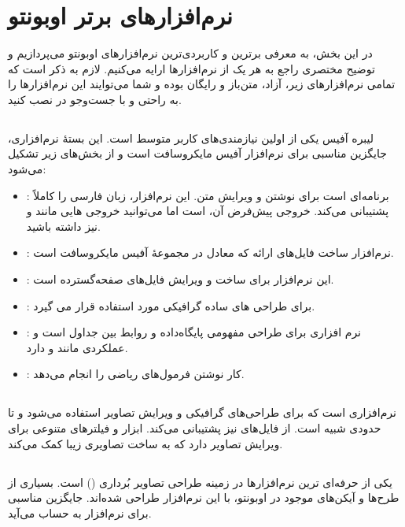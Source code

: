 \chapter{نرم‌افزارهای برتر اوبونتو}
در این بخش، به معرفی برترین و کاربردی‌ترین نرم‌افزارهای اوبونتو می‌پردازیم و توضیح مختصری راجع به هر یک از نرم‌افزارها ارایه می‌کنیم. لازم به ذکر است که تمامی نرم‌افزارهای زیر، آزاد، متن‌باز و رایگان بوده و شما می‌توایند این نرم‌افزارها را به راحتی و با جست‌و‌جو در  نصب کنید.

\section[LibreOffice]{}
لیبره آفیس یکی از اولین نیازمندی‌های کاربر متوسط است. این بستهٔ نرم‌افزاری، جایگزین مناسبی برای نرم‌افزار آفیس مایکروسافت است و از بخش‌های زیر تشکیل می‌شود:
\begin{itemize}
\item {}: برنامه‌ای است برای نوشتن و ویرایش متن. این نرم‌افزار، زبان فارسی را کاملاً پشتیبانی می‌کند. خروجی پیش‌فرض آن،  است اما می‌توانید خروجی هایی مانند  و  نیز داشته باشید.
\item {}: نرم‌افزار ساخت فایل‌های ارائه که معادل  در مجموعهٔ آفیس مایکروسافت است.
\item {}: این نرم‌افزار برای ساخت و ویرایش فایل‌های صفحه‌گسترده است.
\item {}: برای طراحی های ساده گرافیکی مورد استفاده قرار می گیرد.
\item {}: نرم افزاری برای طراحی مفهومی پایگاه‌داده و روابط بین جداول است و عملکردی مانند  و  دارد.
\item {}: کار نوشتن فرمول‌های ریاضی را انجام می‌دهد.
\end{itemize}

\section[Gimp]{}
نرم‌افزاری است که برای طراحی‌های گرافیکی و ویرایش تصاویر استفاده می‌شود و تا حدودی شبیه  است. از فایل‌های  نیز پشتیبانی می‌کند. ابزار و فیلترهای متنوعی برای ویرایش تصاویر دارد که به ساخت تصاویری زیبا کمک می‌کند.

\section[Inkscape]{}
یکی از حرفه‌ای ترین نرم‌افزارها در زمینه طراحی تصاویر بُرداری () است. بسیاری از طرح‌ها و آیکن‌های موجود در اوبونتو، با این نرم‌افزار طراحی شده‌اند.  جایگزین مناسبی برای نرم‌افزار  به حساب می‌آید.

